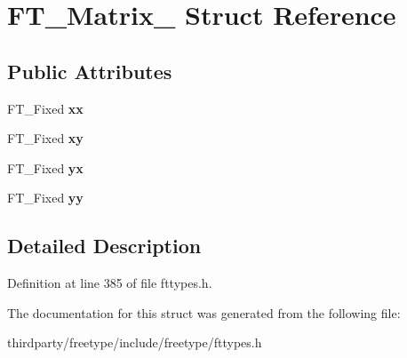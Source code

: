 \hypertarget{struct_f_t___matrix__}{}\section{F\+T\+\_\+\+Matrix\+\_\+ Struct Reference}
\label{struct_f_t___matrix__}
\subsection*{Public Attributes}
\begin{DoxyCompactItemize}
\item 
\mbox{\label{struct_f_t___matrix___a27d51c2958634abe7bf377610e095f74}} 
F\+T\+\_\+\+Fixed {\bfseries xx}
\item 
\mbox{\label{struct_f_t___matrix___a7e9f439d37c00ba1a11919bcaa8937a2}} 
F\+T\+\_\+\+Fixed {\bfseries xy}
\item 
\mbox{\label{struct_f_t___matrix___a55792583a843a1611b43c40534a02a17}} 
F\+T\+\_\+\+Fixed {\bfseries yx}
\item 
\mbox{\label{struct_f_t___matrix___a689a6fd20a88238788b90c3597ee0c2a}} 
F\+T\+\_\+\+Fixed {\bfseries yy}
\end{DoxyCompactItemize}


\subsection{Detailed Description}


Definition at line 385 of file fttypes.\+h.



The documentation for this struct was generated from the following file\+:\begin{DoxyCompactItemize}
\item 
thirdparty/freetype/include/freetype/fttypes.\+h\end{DoxyCompactItemize}
